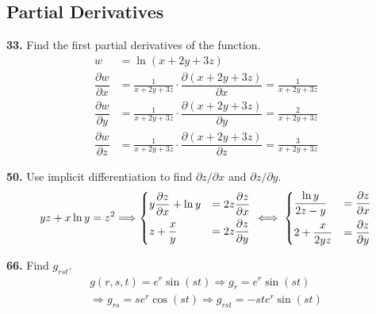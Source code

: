 \documentclass[a4paper,12pt]{article}
\newcommand{\tho}[3][]{\dfrac{\partial #1 #2}{\partial #3 #1}}
\newcommand{\exercise}[1]{\noindent\textbf{#1.}}
\begin{document}
\subsection{Partial Derivatives}
\exercise{33} Find the first partial derivatives of the function.
\begin{align*}
  w &= \ln(x + 2y + 3z)\\
  \tho{w}{x} &= \frac{1}{x + 2y + 3z}\cdot\tho{(x + 2y + 3z)}{x}
              = \frac{1}{x + 2y + 3z}\\
  \tho{w}{y} &= \frac{1}{x + 2y + 3z}\cdot\tho{(x + 2y + 3z)}{y}
              = \frac{2}{x + 2y + 3z}\\
  \tho{w}{z} &= \frac{1}{x + 2y + 3z}\cdot\tho{(x + 2y + 3z)}{z}
              = \frac{3}{x + 2y + 3z}
\end{align*}

\exercise{50} Use implicit differentiation to find
$\partial z/\partial x$ and $\partial z/\partial y$.
\[yz + x\ln y = z^2
\Longrightarrow \begin{dcases}
  y\tho{z}{x} + \ln y &= 2z\tho{z}{x}\\
  z + \frac{x}{y} &= 2z\tho{z}{y}\\
\end{dcases}
\iff \begin{dcases}
  \frac{\ln y}{2z - y} &= \tho{z}{x}\\
  2 + \frac{x}{2yz} &= \tho{z}{y}
\end{dcases}\]

\exercise{66} Find $g_{rst}$.
\begin{multline*}
  g(r, s, t) = e^r\sin(st) \Longrightarrow g_r = e^r\sin(st)\\
  \Longrightarrow g_{rs} = se^r\cos(st) \Longrightarrow g_{rst} = -ste^r\sin(st)
\end{multline*}
\end{document}

